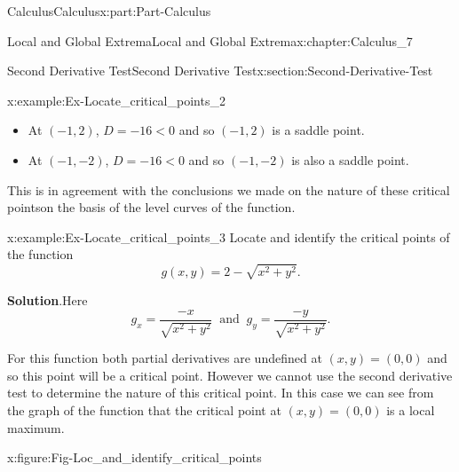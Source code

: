 \documentclass[oneside,10pt,]{book}
\newcommand{\blocktitlefont}{\relax}
\numberwithin{equation}{section}
\begin{document}
\begin{partptx}{Calculus}{}{Calculus}{}{}{x:part:Part-Calculus}
\begin{chapterptx}{Local and Global Extrema}{}{Local and Global Extrema}{}{}{x:chapter:Calculus_7}
\begin{sectionptx}{Second Derivative Test}{}{Second Derivative Test}{}{}{x:section:Second-Derivative-Test}
\begin{example}{}{x:example:Ex-Locate_critical_points_2}
\begin{itemize}[label=\textbullet]
\item{}At \((-1,2)\), \(D=-16 < 0\) and so \((-1,2)\) is a saddle point.%
\item{}At \((-1,-2)\), \(D=-16 < 0\) and so \((-1,-2)\) is also a saddle point.%
\end{itemize}
%
\par
This is in agreement with the conclusions we made on the nature of these critical pointson the basis of the level curves of the function.%
\end{example}
\begin{example}{}{x:example:Ex-Locate_critical_points_3}%
Locate and identify the critical points of the function%
\begin{equation*}
g(x,y) = 2 - \sqrt{x^2+y^2}\text{.}
\end{equation*}
%
\par\smallskip%
\noindent\textbf{\blocktitlefont Solution}.\hypertarget{g:solution:id552780}{}\quad{}Here%
\begin{equation*}
g_x = \dfrac{-x}{\sqrt{x^2+y^2}} \: \text{ and } \: g_y = \dfrac{-y}{\sqrt{x^2+y^2}}\text{.}
\end{equation*}
%
\par
For this function both partial derivatives are undefined at \((x, y) = (0,0)\) and so this point will be a critical point. However we cannot use the second derivative test to determine the nature of this critical point. In this case we can see from the graph of the function that the critical point at \((x, y) = (0,0)\) is a local maximum.%
\begin{figureptx}{}{x:figure:Fig-Loc_and_identify_critical_points}{}%
\begin{image}{0.15}{0.7}{0.15}%

\end{image}
\end{figureptx}
\end{example}
\end{sectionptx}
\end{chapterptx}
\end{partptx}
\end{document}
